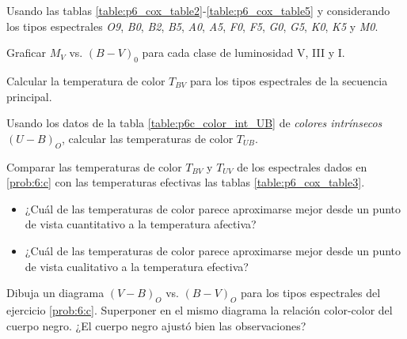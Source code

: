 \documentclass[12pt,a4paper]{practice}
\begin{document}
    \begin{problem}\label{prob:6}
        Usando las tablas \ref{table:p6_cox_table2}-\ref{table:p6_cox_table5} y considerando los tipos espectrales \emph{O9}, \emph{B0}, \emph{B2}, \emph{B5}, \emph{A0}, \emph{A5}, \emph{F0}, \emph{F5}, \emph{G0}, \emph{G5}, \emph{K0}, \emph{K5} y \emph{M0}.

        \begin{ppart}\label{prob:6:a}
            Graficar $M_V$ vs. $\left(B-V\right)_{0}$ para cada clase de luminosidad V, III y I.
        \end{ppart}

        \begin{ppart}\label{prob:6:b}
            Calcular la temperatura de color $T_{BV}$ para los tipos espectrales de la secuencia principal.
        \end{ppart}

        \begin{ppart}\label{prob:6:c}
            Usando los datos de la tabla \ref{table:p6c_color_int_UB} de \emph{colores intrínsecos} $\left(U-B\right)_O$, calcular las temperaturas de color $T_{UB}$.
        \end{ppart}

        \begin{ppart}\label{prob:6:e}
            Comparar las temperaturas de color $T_{BV}$ y $T_{UV}$ de los espectrales dados en \ref{prob:6:c} con las temperaturas efectivas las tablas \ref{table:p6_cox_table3}.

            \begin{itemize}
                \item ¿Cuál de las temperaturas de color parece aproximarse mejor desde un punto de vista cuantitativo a la temperatura afectiva?

                \item ¿Cuál de las temperaturas de color parece aproximarse mejor desde un punto de vista cualitativo a la temperatura efectiva?
            \end{itemize}
        \end{ppart}
    \end{problem}

    \begin{problem}\label{prob:7}
        Dibuja un diagrama $\left(V-B\right)_O$ vs. $\left(B-V\right)_O$ para los tipos espectrales del ejercicio \ref{prob:6:c}. Superponer en el mismo diagrama la relación color-color del cuerpo negro. ¿El cuerpo negro ajustó bien las observaciones?
    \end{problem}
\end{document}
